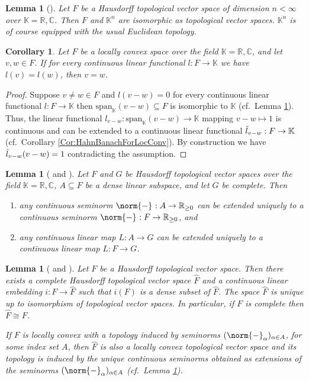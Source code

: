 \documentclass[12pt,a4paper]{article}
\theoremstyle{plain}
\newtheorem{corollary}[theorem]{Corollary}
\newtheorem{lemma}[theorem]{Lemma}
\theoremstyle{definition}
\newcommand{\R}{\mathbb{R}}
\newcommand{\K}{\mathbb{K}}
\newcommand{\nnorm}[2]{\norm{#1}_{#2}}
\begin{document}
\begin{lemma}[{\cite[Theorem 3.1.1]{TVSc}}]
\label{Lemma:FinDimHausdTVS}
Let $F$ be a Hausdorff topological vector space of dimension $n<\infty$ over $\K=\R,\mathbb C$. Then $F$ and $\K^n$ are isomorphic as topological vector spaces. $\K^n$ is of course equipped with the usual Euclidean topology.
\end{lemma}
\begin{corollary}
\label{Cor:l(v)=l(w)Thenv=w}
Let $F$ be a locally convex space over the field $\K=\R,\mathbb C$, and let $v,w\in F$. If for every continuous linear functional $l:F\to \K$ we have $l(v)=l(w)$, then $v=w$.
\end{corollary}
\begin{proof}
Suppose $v\neq w\in F$ and $l(v-w)=0$ for every continuous linear functional $l:F\to \K$ then $\mathrm{span}_\K(v-w)\subseteq F$ is isomorphic to $\K$ (cf.~Lemma \ref{Lemma:FinDimHausdTVS}). Thus, the linear functional $l_{v-w}:\mathrm{span}_\K(v-w)\to \K$ mapping $v-w\mapsto 1$ is continuous and can be extended to a continuous linear functional $\Tilde{l}_{v-w}:F\to \K$ (cf.~Corollary \ref{Cor:HahnBanachForLocConv}). By construction we have $\Tilde{l}_{v-w}(v-w)=1$ contradicting the assumption.
\end{proof}


\begin{lemma}[{\cite[\S4, p.~209]{TVS1Book}} and {\cite[Theorem 2.5.14]{TVSc}}]
\label{Lemma:ExtOfMapsIntoCompHausdTVS}
Let $F$ and $G$ be Hausdorff topological vector spaces over the field $\K=\R,\mathbb C$, $A\subseteq F$ be a dense linear subspace, and let $G$ be complete. Then
\begin{enumerate}
    \item any continuous seminorm $\nnorm{-}{}:A \to \R_{\geq 0}$ can be extended uniquely to a continuous seminorm $\nnorm{-}{}:F\to \R_{\geq 0}$, and
    \item any continuous linear map $L:A\to G$ can be extended uniquely to a continuous linear map $L:F\to G$. 
\end{enumerate}
\end{lemma}

\begin{lemma}[{\cite[Theorem 2.5.15]{TVSc}} and {\cite [\S4, p.~208f]{TVS1Book}}]
\label{Lemma:CompletionAndExtension}
Let $F$ be a Hausdorff topological vector space. Then there exists a complete Hausdorff topological vector space $\hat{F}$ and a continuous linear embedding $i:F\to \hat{F}$ such that $i(F)$ is a dense subset of $\hat{F}$. The space $\hat{F}$ is unique up to isomorphism of topological vector spaces.
In particular, if $F$ is complete then $\hat{F}\cong F$.

If $F$ is locally convex with a topology induced by seminorms $(\nnorm{-}{\alpha})_{\alpha\in A}$, for some index set $A$, then $\hat{F}$ is also a locally convex topological vector space and its topology is induced by the unique continuous seminorms obtained as extensions of the seminorms $(\nnorm{-}{\alpha})_{\alpha\in A}$ (cf.~Lemma \ref{Lemma:ExtOfMapsIntoCompHausdTVS}). 
\end{lemma}
\end{document}
